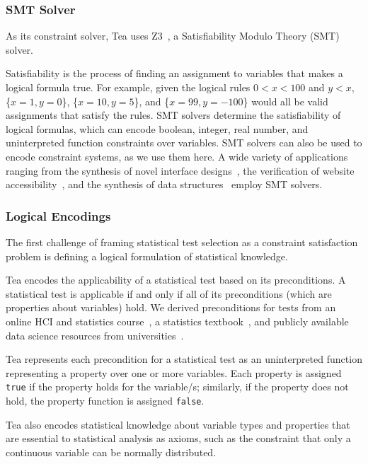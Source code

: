 \subsubsection{SMT Solver}
As its constraint solver, Tea uses Z3~\cite{de2008z3}, a Satisfiability Modulo Theory (SMT) solver.

Satisfiability is the process of finding an assignment to variables that makes a
logical formula true. For example, given the logical rules $0 < x < 100$ and $y
< x$, \{$x = 1, y = 0$\}, \{$x = 10, y = 5$\}, and \{$x = 99, y = -100$\} would all be
valid assignments that satisfy the rules. SMT solvers determine the
satisfiability of logical formulas, which can encode boolean, integer, real
number, and uninterpreted function constraints over variables. SMT solvers can also
be used to encode constraint systems, as we use them here. A wide variety of 
applications ranging from the synthesis of novel interface
designs~\cite{swearngin2018scout}, the verification of website
accessibility~\cite{panchekha2018verifying}, and the synthesis of data
structures~\cite{loncaric2016cozy} employ SMT solvers. 

\vspace{-7pt}
\subsubsection{Logical Encodings}
The first challenge of framing statistical test selection as a constraint satisfaction
problem is defining a logical formulation of statistical
knowledge.

Tea encodes the applicability of a statistical test based on its preconditions.
A statistical test is applicable if and only if all of its preconditions (which
are properties about variables) hold. We derived preconditions for tests
from an online HCI and statistics course~\cite{klemmerCoursera}, a statistics
textbook~\cite{field2012discoveringR}, and publicly available data science
resources from universities~\cite{ucla:whatstat, kent:tutorials}.

Tea represents each precondition for a statistical test as an uninterpreted
function representing a property over one or more variables. Each property is
assigned \texttt{true} if the property holds for the variable/s; similarly, if the
property does not hold, the property function is assigned \texttt{false}.

Tea also encodes statistical knowledge about variable types and properties that
are essential to statistical analysis as axioms, such as the constraint that only a
continuous variable can be normally distributed.

